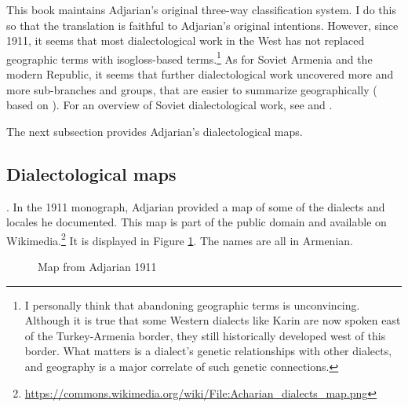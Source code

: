 This book maintains Adjarian's original three-way classification system. I do this so that the translation is faithful to Adjarian's original intentions. However, since 1911, it seems that most dialectological work in the West has not replaced geographic terms with isogloss-based terms.\footnote{I personally think that abandoning geographic terms is unconvincing. Although it is true that some Western dialects like Karin are now spoken east of the Turkey-Armenia border, they still historically developed west of this border. What matters is a dialect's genetic relationships with other dialects, and geography is a major correlate of such genetic connections. } As for Soviet Armenia and the modern Republic, it seems that further dialectological work uncovered more and more sub-branches and groups, that are easier to summarize geographically (\citealt[\S 4]{Martirosyan-2019-Armeniandialects} based on \citealt{Jahukyan-1972-ArmenianDiaolectology}). For an overview of Soviet dialectological work, see \citet{Djahukian-1986-IntroductionToDialectology} and \citet{Weitenberg-2017-DialectologyArmenian}.


The next subsection provides Adjarian's dialectological maps.

\subsection{Dialectological maps}\label{section:HossepIntro:maps}
.
In the 1911 monograph, Adjarian provided a map of some of the dialects and locales he documented. This map is part of the public domain and available on Wikimedia.\footnote{\url{https://commons.wikimedia.org/wiki/File:Acharian_dialects_map.png}} It is displayed in Figure \ref{map:Adjarian1911}. The names are all in Armenian. 

\begin{figure}[H]
	\caption{Map from Adjarian 1911}
	\label{map:Adjarian1911}
\end{figure}




